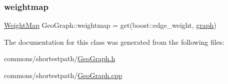 \mbox{\label{class_geo_graph_a8c13836f51794be05e9900814a458c6a}} 
\subsubsection{\texorpdfstring{weightmap}{weightmap}}
{\footnotesize\ttfamily \mbox{\hyperlink{class_geo_graph_abc1f115f69f62ae60f5f0f71f7725a96}{Weight\+Map}} Geo\+Graph\+::weightmap = get(boost\+::edge\+\_\+weight, \mbox{\hyperlink{class_geo_graph_ac58f6685615da10b71249b20e53932c9}{graph}})}



The documentation for this class was generated from the following files\+:\begin{DoxyCompactItemize}
\item 
commons/shortestpath/\mbox{\hyperlink{_geo_graph_8h}{Geo\+Graph.\+h}}\item 
commons/shortestpath/\mbox{\hyperlink{_geo_graph_8cpp}{Geo\+Graph.\+cpp}}\end{DoxyCompactItemize}
